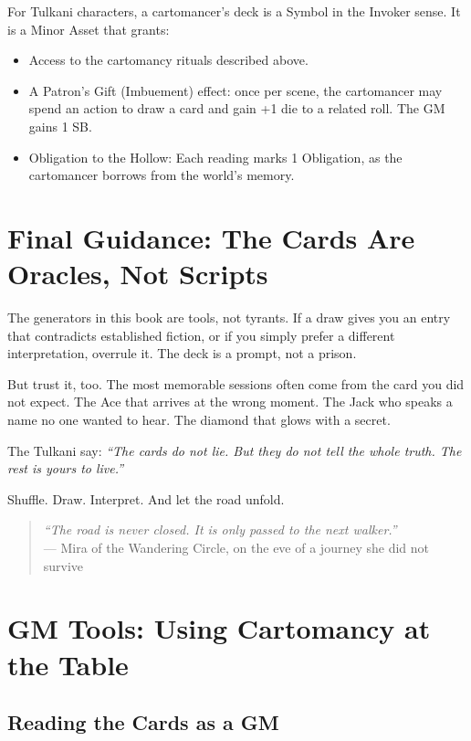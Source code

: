 \documentclass[12pt,oneside]{book}
\begin{document}
For Tulkani characters, a cartomancer's deck is a Symbol in the Invoker sense. It is a Minor Asset that grants:
\begin{itemize}
    \item Access to the cartomancy rituals described above.
    \item A Patron's Gift (Imbuement) effect: once per scene, the cartomancer may spend an action to draw a card and gain +1 die to a related roll. The GM gains 1 SB.
    \item Obligation to the Hollow: Each reading marks 1 Obligation, as the cartomancer borrows from the world's memory.
\end{itemize}

\section*{Final Guidance: The Cards Are Oracles, Not Scripts}

The generators in this book are tools, not tyrants. If a draw gives you an entry that contradicts established fiction, or if you simply prefer a different interpretation, overrule it. The deck is a prompt, not a prison.

But trust it, too. The most memorable sessions often come from the card you did not expect. The Ace that arrives at the wrong moment. The Jack who speaks a name no one wanted to hear. The diamond that glows with a secret.

The Tulkani say: \textit{``The cards do not lie. But they do not tell the whole truth. The rest is yours to live.''}

Shuffle. Draw. Interpret. And let the road unfold.

\vspace{1em}
\begin{quote}
\textit{``The road is never closed. It is only passed to the next walker.''}\\
\hfill --- Mira of the Wandering Circle, on the eve of a journey she did not survive
\end{quote}

\section*{GM Tools: Using Cartomancy at the Table}

\subsection*{Reading the Cards as a GM}
\end{document}

